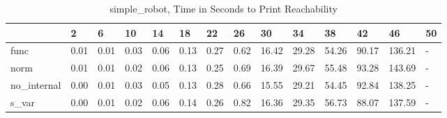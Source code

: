 \begin{table}
\caption{simple_robot, Time in Seconds to Print Reachability}
\label{simple_robot_states_time}
\begin{tabular}{llllllllllllll}
\toprule
 & 2 & 6 & 10 & 14 & 18 & 22 & 26 & 30 & 34 & 38 & 42 & 46 & 50 \\
\midrule
func & 0.01 & 0.01 & 0.03 & 0.06 & 0.13 & 0.27 & 0.62 & 16.42 & 29.28 & 54.26 & 90.17 & 136.21 & - \\
norm & 0.01 & 0.01 & 0.02 & 0.06 & 0.13 & 0.25 & 0.69 & 16.39 & 29.67 & 55.48 & 93.28 & 143.69 & - \\
no_internal & 0.00 & 0.01 & 0.03 & 0.05 & 0.13 & 0.28 & 0.66 & 15.55 & 29.21 & 54.45 & 92.84 & 138.25 & - \\
s_var & 0.00 & 0.01 & 0.02 & 0.06 & 0.14 & 0.26 & 0.82 & 16.36 & 29.35 & 56.73 & 88.07 & 137.59 & - \\
\bottomrule
\end{tabular}
\end{table}
